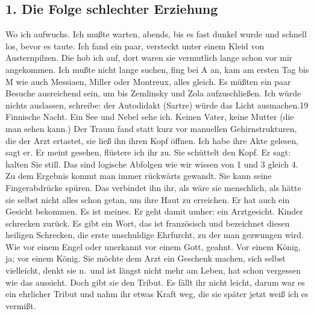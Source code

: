 \documentclass[
]{article}
\author{}
\date{\vspace{-2.5em}}
\begin{document}
\subsection{1. Die Folge schlechter
Erziehung}\label{die-folge-schlechter-erziehung}

Wo ich aufwuchs. Ich mußte warten, abends, bis es fast dunkel wurde und
schnell los, bevor es taute. Ich fand ein paar, versteckt unter einem
Kleid von Austernpilzen. Die hob ich auf, dort waren sie vermutlich
lange schon vor mir angekommen. Ich mußte nicht lange suchen, fing bei A
an, kam am ersten Tag bis M wie auch Messiaen, Miller oder Montreux,
alles gleich. Es müßten ein paar Besuche ausreichend sein, um bis
Zemlinsky und Zola aufzuschließen. Ich würde nichts auslassen, schreibe:
der Autodidakt (Sartre) würde das Licht ausmachen.19 Finnische Nacht.
Ein See und Nebel sehe ich. Keinen Vater, keine Mutter (die man sehen
kann.) Der Traum fand statt kurz vor manuellen Gehirnstrukturen, die der
Arzt ertastet, sie ließ ihn ihren Kopf öffnen. Ich habe ihre Akte
gelesen, sagt er. Er meint gesehen, flüstere ich ihr zu. Sie schüttelt
den Kopf. Er sagt: halten Sie still. Das sind logische Abfolgen wie wir
wissen von 1 und 3 gleich 4. Zu dem Ergebnis kommt man immer rückwärts
gewandt. Sie kann seine Fingerabdrücke spüren. Das verbindet ihn ihr,
als wäre sie menschlich, als hätte sie selbst nicht alles schon getan,
um ihre Haut zu erreichen. Er hat auch ein Gesicht bekommen. Es ist
meines. Er geht damit umher: ein Arztgesicht. Kinder schrecken zurück.
Es gibt ein Wort, das ist französisch und bezeichnet diesen heiligen
Schrecken, die erste unschuldige Ehrfurcht, zu der man gezwungen wird.
Wie vor einem Engel oder unerkannt vor einem Gott, geahnt. Vor einem
König, ja; vor einem König. Sie möchte dem Arzt ein Geschenk machen,
sich selbst vielleicht, denkt sie n.~und ist längst nicht mehr am Leben,
hat schon vergessen wie das aussieht. Doch gibt sie den Tribut. Es fällt
ihr nicht leicht, darum war es ein ehrlicher Tribut und nahm ihr etwas
Kraft weg, die sie später jetzt weiß ich es vermißt.
\end{document}
